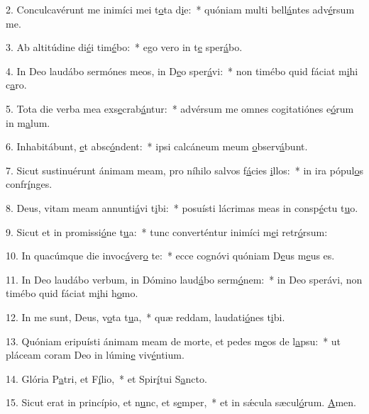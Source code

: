 2. Conculcavérunt me inimíci mei t\uline{o}ta d\uline{i}e:~* quóniam multi bell\uline{á}ntes adv\uline{é}rsum me.\par 
3. Ab altitúdine di\uline{é}i tim\uline{é}bo:~* ego vero in t\uline{e} sper\uline{á}bo.\par 
4. In Deo laudábo sermónes meos, in D\uline{e}o sper\uline{á}vi:~* non timébo quid fáciat m\uline{i}hi c\uline{a}ro.\par 
5. Tota die verba mea exs\uline{e}crab\uline{á}ntur:~* advérsum me omnes cogitatiónes e\uline{ó}rum in m\uline{a}lum.\par 
6. Inhabitábunt, \uline{e}t absc\uline{ó}ndent:~* ipsi calcáneum meum \uline{o}bserv\uline{á}bunt.\par 
7. Sicut sustinuérunt ánimam meam, pro níhilo salvos f\uline{á}cies \uline{i}llos:~* in ira pópul\uline{o}s confr\uline{í}nges.\par 
8. Deus, vitam meam annunti\uline{á}vi t\uline{i}bi:~* posuísti lácrimas meas in consp\uline{é}ctu t\uline{u}o.\par 
9. Sicut et in promissi\uline{ó}ne t\uline{u}a:~* tunc converténtur inimíci m\uline{e}i retr\uline{ó}rsum:\par 
10. In quacúmque die invoc\uline{á}ver\uline{o} te:~* ecce cognóvi quóniam D\uline{e}us m\uline{e}us es.\par 
11. In Deo laudábo verbum, in Dómino laud\uline{á}bo serm\uline{ó}nem:~* in Deo sperávi, non timébo quid fáciat m\uline{i}hi h\uline{o}mo.\par 
12. In me sunt, Deus, v\uline{o}ta t\uline{u}a,~* quæ reddam, laudati\uline{ó}nes t\uline{i}bi.\par 
13. Quóniam eripuísti ánimam meam de morte, et pedes m\uline{e}os de l\uline{a}psu:~* ut pláceam coram Deo in lúmin\uline{e} viv\uline{é}ntium.\par 
14. Glória P\uline{a}tri, et F\uline{í}lio,~* et Spir\uline{í}tui S\uline{a}ncto.\par 
15. Sicut erat in princípio, et n\uline{u}nc, et s\uline{e}mper,~* et in sǽcula sæcul\uline{ó}rum. \uline{A}men.\par 
